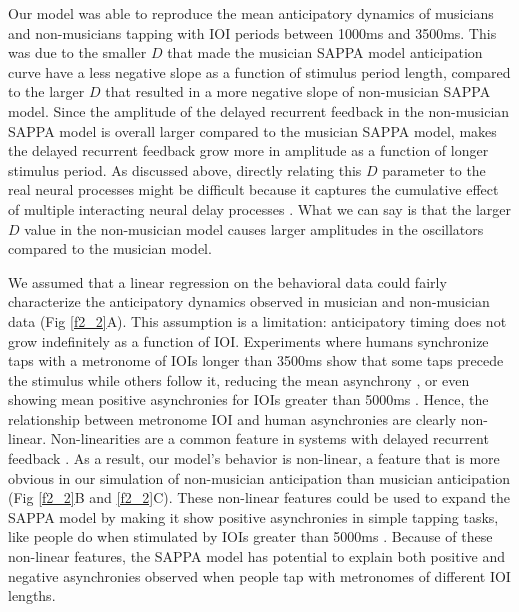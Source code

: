 \documentclass{report}
\begin{document}
Our model was able to reproduce the mean anticipatory dynamics of musicians and non-musicians tapping with IOI periods between 1000ms and 3500ms. This was due to the smaller $D$ that made the musician SAPPA model anticipation curve have a less negative slope as a function of stimulus period length, compared to the larger $D$ that resulted in a more negative slope of non-musician SAPPA model. Since the amplitude of the delayed recurrent feedback in the non-musician SAPPA model is overall larger compared to the musician SAPPA model, makes the delayed recurrent feedback grow more in amplitude as a function of longer stimulus period. As discussed above, directly relating this $D$ parameter to the real neural processes might be difficult because it captures the cumulative effect of multiple interacting neural delay processes \cite{van2003self}. What we can say is that the larger $D$ value in the non-musician model causes larger amplitudes in the oscillators compared to the musician model.

We assumed that a linear regression on the behavioral data could fairly characterize the anticipatory dynamics observed in musician and non-musician data (Fig \ref{f2_2}A). This assumption is a limitation: anticipatory timing does not grow indefinitely as a function of IOI. Experiments where humans synchronize taps with a metronome of IOIs longer than 3500ms show that some taps precede the stimulus while others follow it, reducing the mean asynchrony \cite{baaaath2016estimating}, or even showing mean positive asynchronies for IOIs greater than 5000ms \cite{miyake2004two}. Hence, the relationship between metronome IOI and human asynchronies are clearly non-linear. Non-linearities are a common feature in systems with delayed recurrent feedback \cite{khalil2002nonlinear}. As a result, our model’s behavior is non-linear, a feature that is more obvious in our simulation of non-musician anticipation than musician anticipation (Fig \ref{f2_2}B and \ref{f2_2}C). These non-linear features could be used to expand the SAPPA model by making it show positive asynchronies in simple tapping tasks, like people do when stimulated by IOIs greater than 5000ms \cite{miyake2004two}. Because of these non-linear features, the SAPPA model has potential to explain both positive and negative asynchronies observed when people tap with metronomes of different IOI lengths.
\end{document}
